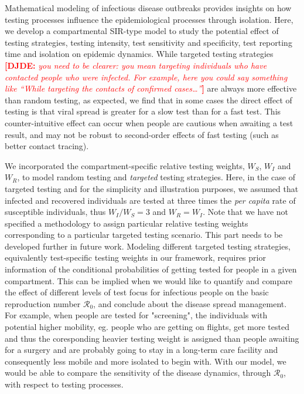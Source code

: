 \documentclass[12pt]{article}
\newcommand{\percap}{\emph{per capita}\xspace}
\newcommand{\Rnum}{\mathcal{R}_0}
\newcommand{\comment}{\showcomment}
\newcommand{\showcomment}[3]{\textcolor{#1}{\textbf{[#2: }\textsl{#3}\textbf{]}}}
\newcommand{\david}[1]{\comment{red}{DJDE}{#1}}
\theoremstyle{definition} %
\begin{document}
Mathematical modeling of infectious disease outbreaks provides insights on how testing processes influence the epidemiological processes through isolation. 
Here, we develop a compartmental SIR-type model to study the potential effect of testing strategies, testing intensity, test sensitivity and specificity, test reporting time and isolation on epidemic dynamics. 
While targeted testing strategies 
\david{you need to be clearer: you mean targeting individuals who have contacted people who were infected.  For example, here you could say something like ``While targeting the contacts of confirmed cases\dots''}
are always more effective than random testing, as expected, we find that in some cases the direct effect of testing is that viral spread
is greater for a slow test than for a fast test. This counter-intuitive effect can occur when people are cautious when awaiting a test result, and may not be robust to second-order effects of fast testing (such as better contact tracing).

We incorporated the compartment-specific relative testing weights, $W_S$, $W_I$ and $W_R$, to model random testing and \emph{targeted} testing strategies. Here, in the case of targeted testing and for the simplicity and illustration purposes, we assumed that infected and recovered individuals are tested at three times the \percap rate of susceptible individuals, thus $W_I/W_S=3$ and $W_R=W_I$. Note that we have not specified a methodology to assign particular relative testing weights corresponding to a particular targeted testing scenario. 
This part needs to be developed further in future work. 
Modeling different targeted testing strategies, equivalently test-specific testing weights in our framework, requires prior information of the conditional probabilities of getting tested for people in a given compartment. 
This can be implied when we would like to quantify and compare the effect of different levels of test focus for infectious people on the basic reproduction number $\Rnum$, and conclude about the disease spread management. For example, when people are tested for "screening", the individuals with potential higher mobility, eg. people who are getting on flights, get more tested and thus the coresponding heavier testing weight is assigned than people awaiting for a surgery and are probably going to stay in a long-term care facility and consequently less mobile and more isolated to begin with. With our model, we would be able to compare the sensitivity of the disease dynamics, through $\Rnum$, with respect to testing processes.
\end{document}
